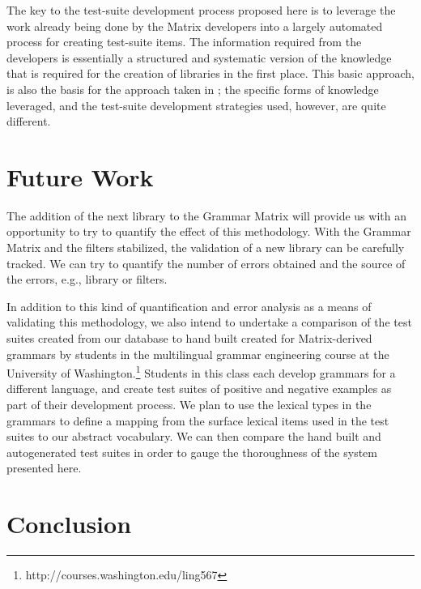 \documentclass[11pt]{article}
\begin{document}
The key to the test-suite development process proposed here is to
leverage the work already being done by the Matrix developers into a
largely automated process for creating test-suite items. The
information required from the developers is essentially a structured
and systematic version of the knowledge that is required for the
creation of libraries in the first place.  This basic
approach, is also the basis for the approach taken in
\cite{bro:00}; the specific forms of knowledge leveraged, and the
test-suite development strategies used, however, are quite different.



\section{Future Work}

The addition of the next library to the Grammar Matrix will provide
us with an opportunity to try to quantify the effect of this
methodology.  With the Grammar Matrix and the filters stabilized, the
validation of a new library can be carefully tracked.  We can try to
quantify the number of errors obtained and the source of the errors,
e.g., library or filters.

In addition to this kind of quantification and error analysis as a
means of validating this methodology, we also intend to undertake a
comparison of the test suites created from our database to hand built
created for Matrix-derived grammars by students in the multilingual
grammar engineering course at the University of
Washington.\footnote{http://courses.washington.edu/ling567} Students
in this class each develop grammars for a different language, and
create test suites of positive and negative examples as part of their
development process.  We plan to use the lexical types in the grammars
to define a mapping from the surface lexical items used in the test
suites to our abstract vocabulary.  We can then compare the hand built
and autogenerated test suites in order to gauge the thoroughness of
the system presented here.

\section{Conclusion}
\end{document}
